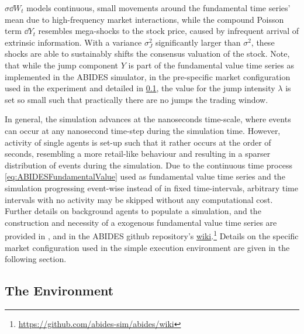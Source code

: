 \documentclass[
    a4paper,
    11pt,
    bibliography=totoc,
    listof=totoc,      
    headinclude=true,
    cleardoublepage=empty,
]{scrbook}
\theoremstyle{plain}
\theoremstyle{definition}
\theoremstyle{remark}
\begin{document}
$\sigma\dd{W_t}$ models continuous, small movements around the fundamental time
series' mean due to high-frequency market interactions, while the compound
Poisson term $\dd{Y_t}$ resembles mega-shocks to the stock price, caused by
infrequent arrival of extrinsic information. With a variance $\sigma_J^2$
significantly larger than $\sigma^2$, these shocks are able to sustainably
shifts the consensus valuation of the stock. Note, that while the jump 
component $Y$ is part of the fundamental value time series as implemented in 
the ABIDES simulator, in the pre-specific market configuration used in the 
experiment and detailed in 
\cref{chapter:Experiments:section:Execution:sub:Environment}, the value for 
the jump intensity $\lambda$ is set so small such that practically there 
are no jumps the trading window.  

In general, the simulation advances at the nanoseconds time-scale, where
events can occur at any nanosecond time-step during the simulation time.
However, activity of single agents is set-up such that it rather occurs at the 
order of seconds, resembling a more retail-like behaviour and resulting in a 
sparser distribution of events during the simulation. Due to the continuous 
time process \eqref{eq:ABIDESFundamentalValue} used as fundamental value time 
series and the simulation progressing event-wise instead of in fixed 
time-intervals, arbitrary time intervals with no activity may be skipped 
without any computational cost. Further details on background agents to 
populate a simulation, and the construction and necessity of a exogenous 
fundamental value time series are provided in \cite{byrd2020_athmms, 
byrd2019_eafms}, and in the ABIDES github repository's 
\href{https://github.com/abides-sim/abides/wiki}{wiki}.\footnote{
    \url{https://github.com/abides-sim/abides/wiki}
}
Details on the specific market configuration used in the simple execution
environment are given in the following section.

\subsection{The Environment}
\label{chapter:Experiments:section:Execution:sub:Environment}
\end{document}
